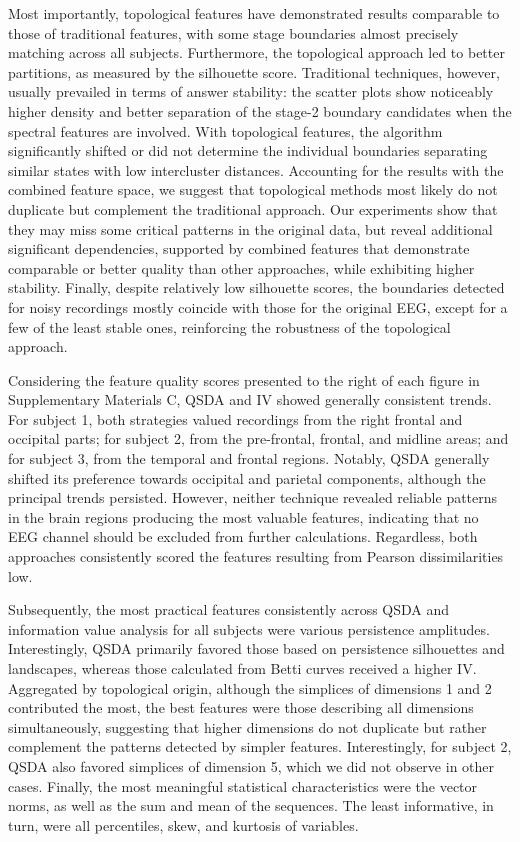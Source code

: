 \documentclass[pdflatex,sn-basic,Numbered]{sn-jnl}
\begin{document}
Most importantly, topological features have demonstrated results comparable to those of traditional features, with some stage boundaries almost precisely matching across all subjects. Furthermore, the topological approach led to better partitions, as measured by the silhouette score. Traditional techniques, however, usually prevailed in terms of answer stability: the scatter plots show noticeably higher density and better separation of the stage\mbox{-}2 boundary candidates when the spectral features are involved. With topological features, the algorithm significantly shifted or did not determine the individual boundaries separating similar states with low intercluster distances. Accounting for the results with the combined feature space, we suggest that topological methods most likely do not duplicate but complement the traditional approach. Our experiments show that they may miss some critical patterns in the original data, but reveal additional significant dependencies, supported by combined features that demonstrate comparable or better quality than other approaches, while exhibiting higher stability. Finally, despite relatively low silhouette scores, the boundaries detected for noisy recordings mostly coincide with those for the original EEG, except for a few of the least stable ones, reinforcing the robustness of the topological approach.

Considering the feature quality scores presented to the right of each figure in Supplementary Materials C, QSDA and IV showed generally consistent trends. For subject 1, both strategies valued recordings from the right frontal and occipital parts; for subject 2, from the pre-frontal, frontal, and midline areas; and for subject 3, from the temporal and frontal regions. Notably, QSDA generally shifted its preference towards occipital and parietal components, although the principal trends persisted. However, neither technique revealed reliable patterns in the brain regions producing the most valuable features, indicating that no EEG channel should be excluded from further calculations. Regardless, both approaches consistently scored the features resulting from Pearson dissimilarities low.
 
Subsequently, the most practical features consistently across QSDA and information value analysis for all subjects were various persistence amplitudes. Interestingly, QSDA primarily favored those based on persistence silhouettes and landscapes, whereas those calculated from Betti curves received a higher IV. Aggregated by topological origin, although the simplices of dimensions 1 and 2 contributed the most, the best features were those describing all dimensions simultaneously, suggesting that higher dimensions do not duplicate but rather complement the patterns detected by simpler features. Interestingly, for subject 2, QSDA also favored simplices of dimension 5, which we did not observe in other cases. Finally, the most meaningful statistical characteristics were the vector norms, as well as the sum and mean of the sequences. The least informative, in turn, were all percentiles, skew, and kurtosis of variables.
\end{document}
